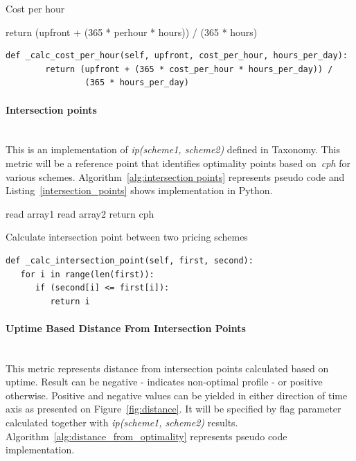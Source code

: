\documentclass[]{final_report}
\newcommand{\myparagraph}[1]{\paragraph{#1}\mbox{}\\}
\begin{document}
\begin{algorithm}[H]
 \caption{Cost per hour}
 \label{alg:cost_per_hour}
 return (upfront + (365 * perhour * hours)) / (365 * hours)
\end{algorithm}

\begin{minipage}{\linewidth}
\begin{lstlisting}[label={cost_per_hour},caption={Uptime per machine implementation in Apache Spark},frame=single] 
def _calc_cost_per_hour(self, upfront, cost_per_hour, hours_per_day):
        return (upfront + (365 * cost_per_hour * hours_per_day)) /
                (365 * hours_per_day)
\end{lstlisting}
\end{minipage}

\myparagraph{Intersection points}

This is an implementation of \textit{ip(scheme1, scheme2)} defined in Taxonomy. This metric will be a reference point that identifies optimality points based on~\textit{cph} for various schemes. Algorithm~\ref{alg:intersection points} represents pseudo code and Listing~\ref{intersection_points} shows implementation in Python. 

\begin{algorithm}[H]
 \label{alg:intersection points}
 read array1\;
 read array2\;
  {
 	 {
 		return cph
 	}
 }
\caption{Calculate intersection point between two pricing schemes}
\end{algorithm}

\begin{minipage}{\linewidth}
\begin{lstlisting}[label={intersection_points},caption={Intersection point between various pricing schemes},frame=single] 
def _calc_intersection_point(self, first, second):
   for i in range(len(first)):
      if (second[i] <= first[i]):
         return i
\end{lstlisting}
\end{minipage}

\myparagraph{Uptime Based Distance From Intersection Points}

This metric represents distance from intersection points calculated based on uptime. Result can be negative - indicates non-optimal profile - or positive otherwise. Positive and negative values can be yielded in either direction of time axis as presented on Figure~\ref{fig:distance}. 
It will be specified by flag parameter calculated together with \textit{ip(scheme1, scheme2)} results. Algorithm~\ref{alg:distance_from_optimality} represents pseudo code implementation.
\end{document}
